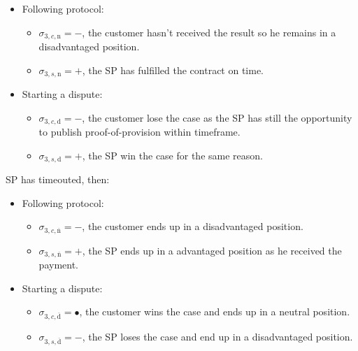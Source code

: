 \documentclass{ieeeaccess}
\begin{document}
\begin{itemize}
\item
  Following protocol:

  \begin{itemize}
  
  \item
    \(\sigma_{3, c, \mathrm{n}} = -\), the customer hasn't received the
    result so he remains in a disadvantaged position.
  \item
    \(\sigma_{3, s, \mathrm{n}} = +\), the SP has fulfilled the contract
    on time.
  \end{itemize}
\item
  Starting a dispute:

  \begin{itemize}
  
  \item
    \(\sigma_{3, c, \mathrm{d}} = -\), the customer lose the case as the
    SP has still the opportunity to publish proof-of-provision within
    timeframe.
  \item
    \(\sigma_{3, s, \mathrm{d}} = +\), the SP win the case for the same
    reason.
  \end{itemize}
\end{itemize}

SP has timeouted, then:

\begin{itemize}
\item
  Following protocol:

  \begin{itemize}
  
  \item
    \(\sigma_{3, c, \overline{\mathrm{n}}} = -\), the customer ends up in a disadvantaged position.
  \item
    \(\sigma_{3, s, \overline{\mathrm{n}}} = +\), the SP ends up in a
    advantaged position as he received the payment.
  \end{itemize}
\item
  Starting a dispute:

  \begin{itemize}
  
  \item
    \(\sigma_{3, c, \overline{\mathrm{d}}} = •\), the customer wins the case and ends up in a neutral position.
  \item
    \(\sigma_{3, s, \overline{\mathrm{d}}} = -\), the SP loses the case
    and end up in a disadvantaged position.
  \end{itemize}
\end{itemize}
\end{document}
